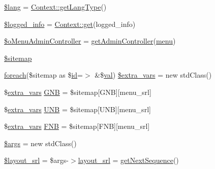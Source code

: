 \begin{DoxyCompactItemize}
\item 
\hyperlink{ko_8install_8php_a7714b111b644017933931ec69a154102}{\$lang} = \hyperlink{classContext_ae75d6f4064d09e48d0d76614b6997e29}{Context\+::get\+Lang\+Type}()
\item 
\hyperlink{ko_8install_8php_a193c1593ceb216e9fb05b0bad01ebbc8}{\$logged\+\_\+info} = \hyperlink{classContext_a90ce25d65fe6c9778421cbb36ab3def5}{Context\+::get}(\textquotesingle{}logged\+\_\+info\textquotesingle{})
\item 
\hyperlink{ko_8install_8php_a9062530c3b03479ca4530daee1c18887}{\$o\+Menu\+Admin\+Controller} = \hyperlink{func_8inc_8php_a2f7ca88a5226536aca3b2f5682bd7b2d}{get\+Admin\+Controller}(\textquotesingle{}\hyperlink{classmenu}{menu}\textquotesingle{})
\item 
\hyperlink{ko_8install_8php_ae7b8fee391a6d8b9162de5b69b9dc07f}{\$sitemap}
\item 
\hyperlink{ReadMe_8txt_a78ed9bdcd90fd96af66d03ef8b32649c}{foreach}(\$sitemap as \$\hyperlink{JSSpec_8js_ae8ddf9e890c62bf03be54143867a14a8}{id}=$>$ \&\$\hyperlink{ckeditor_2js_2xe__interface_8js_a4fb96abdf073a439bca5e051c333b35d}{val}) \hyperlink{ko_8install_8php_a99863a9d4b597491e1a9c801f2e55c0b}{\$extra\+\_\+vars} = new std\+Class()
\item 
\$\hyperlink{ko_8install_8php_ae1dcb37fc34a8f312d2e6abd6f806743}{extra\+\_\+vars} \hyperlink{ko_8install_8php_a9b1716b68fc04f3492448f38148dcbf5}{G\+NB} = \$sitemap\mbox{[}\textquotesingle{}G\+NB\textquotesingle{}\mbox{]}\mbox{[}\textquotesingle{}menu\+\_\+srl\textquotesingle{}\mbox{]}
\item 
\$\hyperlink{ko_8install_8php_ae1dcb37fc34a8f312d2e6abd6f806743}{extra\+\_\+vars} \hyperlink{ko_8install_8php_abc0cb1f57d83d4a106f4495c30e0df52}{U\+NB} = \$sitemap\mbox{[}\textquotesingle{}U\+NB\textquotesingle{}\mbox{]}\mbox{[}\textquotesingle{}menu\+\_\+srl\textquotesingle{}\mbox{]}
\item 
\$\hyperlink{ko_8install_8php_ae1dcb37fc34a8f312d2e6abd6f806743}{extra\+\_\+vars} \hyperlink{ko_8install_8php_a683e060c22be3e658be6f9751a2082f0}{F\+NB} = \$sitemap\mbox{[}\textquotesingle{}F\+NB\textquotesingle{}\mbox{]}\mbox{[}\textquotesingle{}menu\+\_\+srl\textquotesingle{}\mbox{]}
\item 
\hyperlink{ko_8install_8php_a67e94494731d99ed23b123e95175bc10}{\$args} = new std\+Class()
\item 
\hyperlink{ko_8install_8php_a77889723c4aa360089caae223118d413}{\$layout\+\_\+srl} = \$args-\/$>$\hyperlink{ko_8install_8php_a70054876db09b2519a1726663c8dd9e7}{layout\+\_\+srl} = \hyperlink{func_8inc_8php_a5a97b458f9c5b4fe3574671840aee27c}{get\+Next\+Sequence}()

\end{DoxyCompactItemize}
